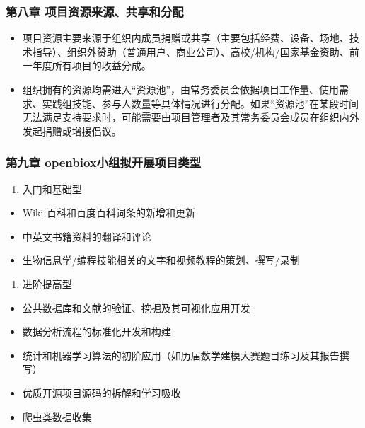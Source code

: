 \documentclass[]{article}
\providecommand{\tightlist}{%
  \setlength{\itemsep}{0pt}\setlength{\parskip}{0pt}}
\begin{document}
\subsubsection{第八章 项目资源来源、共享和分配}\label{-}

\begin{itemize}
\item
  项目资源主要来源于组织内成员捐赠或共享（主要包括经费、设备、场地、技术指导）、组织外赞助（普通用户、商业公司）、高校/机构/国家基金资助、前一年度所有项目的收益分成。
\item
  组织拥有的资源均需进入``资源池''，由常务委员会依据项目工作量、使用需求、实践组技能、参与人数量等具体情况进行分配。如果``资源池''在某段时间无法满足支持要求时，可能需要由项目管理者及其常务委员会成员在组织内外发起捐赠或增援倡议。
\end{itemize}

\subsubsection{第九章 openbiox小组拟开展项目类型}\label{-openbiox}

\begin{enumerate}
\def\labelenumi{\arabic{enumi}.}
\tightlist
\item
  入门和基础型
\end{enumerate}

\begin{itemize}
\tightlist
\item
  Wiki 百科和百度百科词条的新增和更新
\item
  中英文书籍资料的翻译和评论
\item
  生物信息学/编程技能相关的文字和视频教程的策划、撰写/录制
\end{itemize}

\begin{enumerate}
\def\labelenumi{\arabic{enumi}.}
\setcounter{enumi}{1}
\tightlist
\item
  进阶提高型
\end{enumerate}

\begin{itemize}
\tightlist
\item
  公共数据库和文献的验证、挖掘及其可视化应用开发
\item
  数据分析流程的标准化开发和构建
\item
  统计和机器学习算法的初阶应用（如历届数学建模大赛题目练习及其报告撰写）
\item
  优质开源项目源码的拆解和学习吸收
\item
  爬虫类数据收集
\end{itemize}
\end{document}

